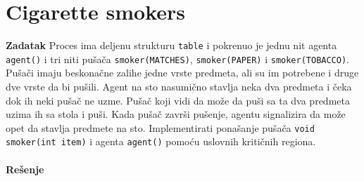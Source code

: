 \clearpage
\section{\latin Cigarette smokers}
\textbf{\large Zadatak} Proces ima deljenu strukturu \texttt{table} i pokrenuo je jednu nit agenta \texttt{agent()} i tri niti pu\v{s}a\v{c}a \texttt{smoker(MATCHES)}, \texttt{smoker(PAPER)} i \texttt{smoker(TOBACCO)}. Pu\v{s}a\v{c}i imaju beskona\v{c}ne zalihe jedne vrste predmeta, ali su im potrebene i druge dve vrste da bi pu\v{s}ili. Agent na sto nasumi\v{c}no stavlja neka dva  predmeta i \v{c}eka dok ih neki pu\v{s}a\v{c} ne uzme. Pu\v{s}a\v{c} koji vidi da mo\v{z}e da pu\v{s}i sa ta dva predmeta uzima ih sa stola i pu\v{s}i. Kada pu\v{s}a\v{c} zavr\v{s}i pu\v{s}enje, agentu signalizira da mo\v{z}e opet da stavlja predmete na sto. Implementirati pona\v{s}anje pu\v{s}a\v{c}a \texttt{void smoker(int item)} i agenta \texttt{agent()} pomo\'{c}u uslovnih kriti\v{c}nih regiona.
\\\\
\textbf{\large Re\v{s}enje}
